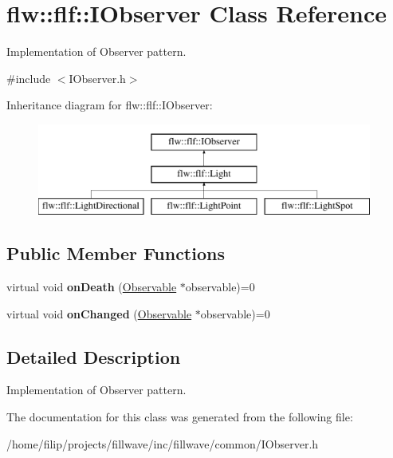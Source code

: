 \hypertarget{classflw_1_1flf_1_1IObserver}{}\section{flw\+:\+:flf\+:\+:I\+Observer Class Reference}
\label{classflw_1_1flf_1_1IObserver}


Implementation of Observer pattern.  




{\ttfamily \#include $<$I\+Observer.\+h$>$}

Inheritance diagram for flw\+:\+:flf\+:\+:I\+Observer\+:\begin{figure}[H]
\begin{center}
\leavevmode
\includegraphics[height=3.000000cm]{classflw_1_1flf_1_1IObserver}
\end{center}
\end{figure}
\subsection*{Public Member Functions}
\begin{DoxyCompactItemize}
\item 
\mbox{\label{classflw_1_1flf_1_1IObserver_ae87039fbfc41d947d3c6d945ae8004b9}} 
virtual void {\bfseries on\+Death} (\hyperlink{classflw_1_1flf_1_1Observable}{Observable} $\ast$observable)=0
\item 
\mbox{\label{classflw_1_1flf_1_1IObserver_a723ba4520e97e3602d01d70080092ea1}} 
virtual void {\bfseries on\+Changed} (\hyperlink{classflw_1_1flf_1_1Observable}{Observable} $\ast$observable)=0
\end{DoxyCompactItemize}


\subsection{Detailed Description}
Implementation of Observer pattern. 

The documentation for this class was generated from the following file\+:\begin{DoxyCompactItemize}
\item 
/home/filip/projects/fillwave/inc/fillwave/common/I\+Observer.\+h\end{DoxyCompactItemize}
